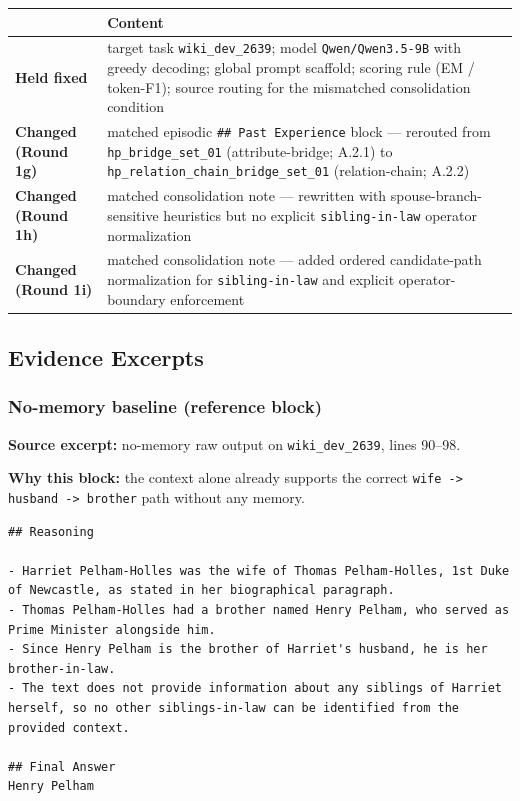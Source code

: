 \begin{center}
\begin{tabularx}{\textwidth}{>{\raggedright\arraybackslash}p{}Y}
\toprule
 & Content \\
\midrule
\textbf{Held fixed} & target task \texttt{wiki\_dev\_2639}; model \texttt{Qwen/Qwen3.5-9B} with greedy decoding; global prompt scaffold; scoring rule (EM / token-F1); source routing for the mismatched consolidation condition \\
\textbf{Changed (Round 1g)} & matched episodic \texttt{\#\# Past Experience} block --- rerouted from \texttt{hp\_bridge\_set\_01} (attribute-bridge; A.2.1) to \texttt{hp\_relation\_chain\_bridge\_set\_01} (relation-chain; A.2.2) \\
\textbf{Changed (Round 1h)} & matched consolidation note --- rewritten with spouse-branch-sensitive heuristics but no explicit \texttt{sibling-in-law} operator normalization \\
\textbf{Changed (Round 1i)} & matched consolidation note --- added ordered candidate-path normalization for \texttt{sibling-in-law} and explicit operator-boundary enforcement \\
\bottomrule
\end{tabularx}
\end{center}

\subsection{Evidence Excerpts}

\subsubsection{No-memory baseline (reference block)}

\textbf{Source excerpt:} no-memory raw output on \texttt{wiki\_dev\_2639}, lines 90--98.

\textbf{Why this block:} the context alone already supports the correct \texttt{wife -> husband -> brother} path without any memory.

\begin{lstlisting}
## Reasoning

- Harriet Pelham-Holles was the wife of Thomas Pelham-Holles, 1st Duke of Newcastle, as stated in her biographical paragraph.
- Thomas Pelham-Holles had a brother named Henry Pelham, who served as Prime Minister alongside him.
- Since Henry Pelham is the brother of Harriet's husband, he is her brother-in-law.
- The text does not provide information about any siblings of Harriet herself, so no other siblings-in-law can be identified from the provided context.

## Final Answer
Henry Pelham
\end{lstlisting}

